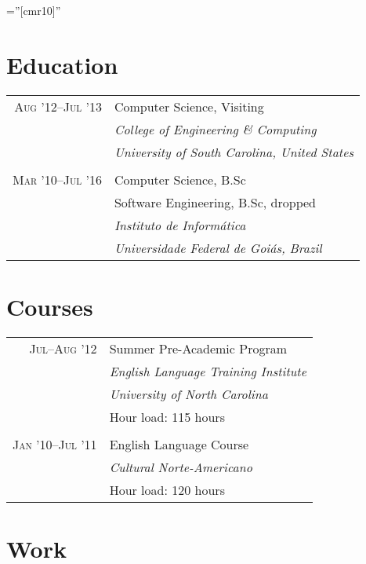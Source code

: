 \documentclass[a4paper,10pt]{article}
\begin{document}
\font\fb=''[cmr10]''


\section{Education}

\begin{tabular}{r|p{11cm}}
  \textsc{Aug '12--Jul '13} & Computer Science, Visiting\\ &
  \emph{College of Engineering \& Computing}\\ &
  \emph{University of South Carolina, United States}
  \\\multicolumn{2}{c}{} \\

  \textsc{Mar '10--Jul '16} & Computer Science, B.Sc\\ &
  Software Engineering, B.Sc, dropped \\ &
  \emph{Instituto de Informática}\\ &
  \emph{Universidade Federal de Goiás, Brazil} \\
\end{tabular}

\section{Courses}

\begin{tabular}{r|p{11cm}}
  \textsc{Jul--Aug '12} & Summer Pre-Academic Program\\ &
  \emph{English Language Training Institute}\\ &
  \emph{University of North Carolina}\\ &
  Hour load: 115 hours
  \\\multicolumn{2}{c}{} \\

  \textsc{Jan '10--Jul '11} & English Language Course\\ &
  \emph{Cultural Norte-Americano} \\ &
  Hour load: 120 hours
\end{tabular}

\section{Work}
\end{document}
